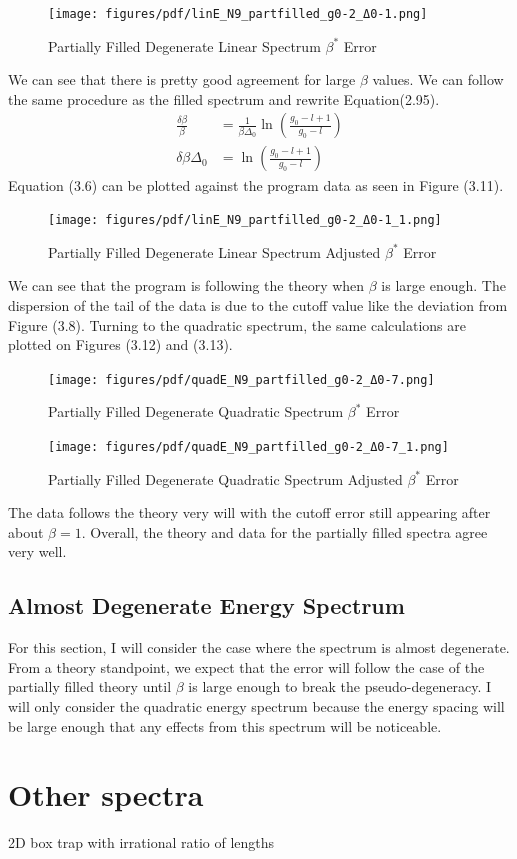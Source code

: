\begin{figure}[H]
    \centering
    \texttt{[image: figures/pdf/linE\_N9\_partfilled\_g0-2\_Δ0-1.png]}
    \caption{Partially Filled Degenerate Linear Spectrum $\beta^*$ Error}
    \label{fig:PartiallyFilledDegenerateLinearSpectrum}
\end{figure}

We can see that there is pretty good agreement for large $\beta$ values. We can follow the same procedure as the filled spectrum and rewrite Equation(2.95).
\begin{align}
    \frac{\delta\beta}{\beta}&=\frac{1}{\beta\Delta_0}\ln(\frac{g_0-l+1}{g_0-l})\\
    \delta\beta \Delta_0&=\ln(\frac{g_0-l+1}{g_0-l})
\end{align}
Equation (3.6) can be plotted against the program data as seen in Figure (3.11). 

\begin{figure}[H]
    \centering
    \texttt{[image: figures/pdf/linE\_N9\_partfilled\_g0-2\_Δ0-1\_1.png]}
    \caption{Partially Filled Degenerate Linear Spectrum Adjusted $\beta^*$ Error}
    \label{fig:PartiallyFilledDegenerateLinearSpectrumAdjustedError}
\end{figure}
We can see that the program is following the theory when $\beta$ is large enough. The dispersion of the tail of the data is due to the cutoff value like the deviation from Figure (3.8). Turning to the quadratic spectrum, the same calculations are plotted on Figures (3.12) and (3.13). 

\begin{figure}[H]
    \centering
    \texttt{[image: figures/pdf/quadE\_N9\_partfilled\_g0-2\_Δ0-7.png]}
    \caption{Partially Filled Degenerate Quadratic Spectrum $\beta^*$ Error}
    \label{fig:PartiallyFilledDegenerateQuadraticSpectrumError}
\end{figure}

\begin{figure}[H]
    \centering
    \texttt{[image: figures/pdf/quadE\_N9\_partfilled\_g0-2\_Δ0-7\_1.png]}
    \caption{Partially Filled Degenerate Quadratic Spectrum Adjusted $\beta^*$ Error}
    \label{fig:PartiallyFilledDegenerateQuadraticSpectrumAdjustedError}
\end{figure}

The data follows the theory very will with the cutoff error still appearing after about $\beta=1$. Overall, the theory and data for the partially filled spectra agree very well. 
\subsection{Almost Degenerate Energy Spectrum}
For this section, I will consider the case where the spectrum is almost degenerate. From a theory standpoint, we expect that the error will follow the case of the partially filled theory until $\beta$ is large enough to break the pseudo-degeneracy. I will only consider the quadratic energy spectrum because the energy spacing will be large enough that any effects from this spectrum will be noticeable. 



\section{Other spectra}  
2D box trap with irrational ratio of lengths
